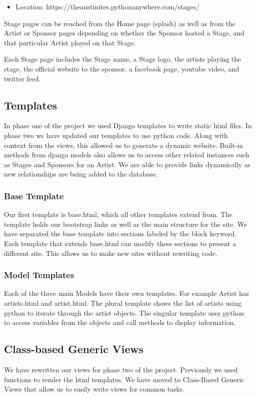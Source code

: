 \documentclass[12pt,english]{scrartcl}
\begin{document}
\begin{itemize}
 \item Location: https://theaustinites.pythonanywhere.com/stages/
\end{itemize}

Stage pages can be reached from the Home page (splash) as well as from the Artist or Sponsor pages depending on whether the Sponsor hosted a
Stage, and that particular Artist played on that Stage. 

Each Stage page includes the Stage name, a Stage logo, the artists playing the stage, the official website to the sponsor,
a facebook page, youtube video, and twitter feed.

\subsection{Templates}
In phase one of the project we used Django templates to write static html files. In phase two we have updated our templates to use python code. Along with context from the views,
this allowed us to generate a dynamic website. Built-in methods from django models also allows us to access other related instances such as Stages and Sponsors for an Artist. We are able to 
provide links dynamically as new relationships are being added to the database.

\subsubsection{Base Template}
Our first template is base.html, which all other templates extend from. The template holds our bootstrap links as well as the main structure for the site.
We have separated the base template into sections labeled by the block keyword. Each template that extends base.html
can modify these sections to present a different site. This allows us to make new sites without rewriting code.

\subsubsection{Model Templates}
Each of the three main Models have their own templates. For example Artist has artists.html and artist.html. The plural template shows the list of artists using python to
iterate through the artist objects. The singular template uses python to access variables from the objects and call methods to display information.

\subsection{Class-based Generic Views}
We have rewritten our views for phase two of the project. Previously we used functions to render the html templates. We have moved to Class-Based Generic Views
that allow us to easily write views for common tasks. 
\end{document}
